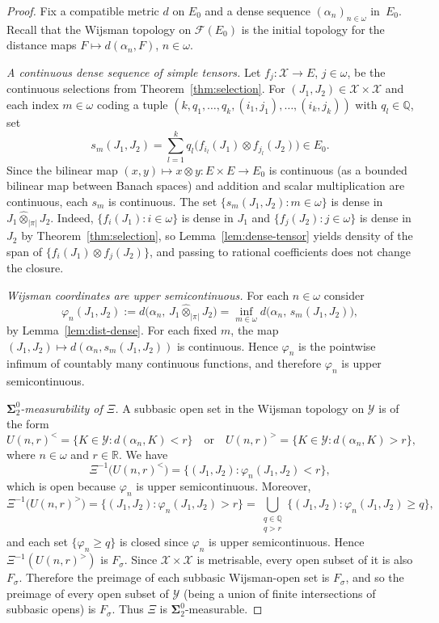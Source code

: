 \documentclass[10pt,a4paper]{amsart}
\newcommand{\R}{\mathbb{R}}
\newcommand{\bbQ}{\mathbb{Q}}
\renewcommand{\ge}{\geqslant}
\begin{document}
\begin{proof}
Fix a compatible metric $d$ on $E_0$ and a dense sequence
$(\alpha_n)_{n \in \omega}$ in~$E_0$.  Recall that the Wijsman topology on
$\mathcal{F}(E_0)$ is the initial topology for the distance maps
$F \mapsto d(\alpha_n, F)$, $n \in \omega$.

\medskip
\emph{A continuous dense sequence of simple tensors.}
Let $f_j \colon \mathscr{X} \to E$, $j \in \omega$, be the continuous selections
from Theorem~\ref{thm:selection}.  For
$(J_1, J_2) \in \mathscr{X} \times \mathscr{X}$ and each index $m \in \omega$
coding a tuple $(k, q_1, \ldots, q_k, (i_1, j_1), \ldots, (i_k, j_k))$ with
$q_l \in \bbQ$, set
\[
    s_m(J_1, J_2)
    = \sum_{l=1}^k q_l \bigl(f_{i_l}(J_1) \otimes f_{j_l}(J_2)\bigr) \in E_0.
\]
Since the bilinear map $(x, y) \mapsto x \otimes y \colon E \times E \to E_0$ is
continuous (as a bounded bilinear map between Banach spaces) and addition and
scalar multiplication are continuous, each $s_m$ is continuous.  The set
$\{s_m(J_1, J_2) \colon m \in \omega\}$ is dense in
$J_1 \hat{\otimes}_{|\pi|} J_2$.  Indeed,
$\{f_i(J_1) \colon i \in \omega\}$ is dense in $J_1$ and
$\{f_j(J_2) \colon j \in \omega\}$ is dense in $J_2$ by
Theorem~\ref{thm:selection}, so Lemma~\ref{lem:dense-tensor} yields density of
the span of $\{f_i(J_1) \otimes f_j(J_2)\}$, and passing to rational
coefficients does not change the closure.

\medskip
\emph{Wijsman coordinates are upper semicontinuous.}
For each $n \in \omega$ consider
\[
    \varphi_n(J_1, J_2)
    := d\bigl(\alpha_n,\, J_1 \hat{\otimes}_{|\pi|} J_2\bigr)
    = \inf_{m \in \omega} d\bigl(\alpha_n,\, s_m(J_1, J_2)\bigr),
\]
by Lemma~\ref{lem:dist-dense}.  For each fixed $m$, the map
$(J_1, J_2) \mapsto d(\alpha_n, s_m(J_1, J_2))$ is continuous.  Hence $\varphi_n$
is the pointwise infimum of countably many continuous functions, and therefore
$\varphi_n$ is upper semicontinuous.

\medskip
\emph{$\boldsymbol{\Sigma}^0_2$-measurability of $\Xi$.}
A subbasic open set in the Wijsman topology on $\mathscr{Y}$ is of the form
\[
    U(n,r)^{<} = \{K \in \mathscr{Y} \colon d(\alpha_n, K) < r\}
    \quad\text{or}\quad
    U(n,r)^{>} = \{K \in \mathscr{Y} \colon d(\alpha_n, K) > r\},
\]
where $n \in \omega$ and $r \in \R$.  We have
\[
    \Xi^{-1}\bigl(U(n,r)^{<}\bigr)
    = \{(J_1, J_2) \colon \varphi_n(J_1, J_2) < r\},
\]
which is open because $\varphi_n$ is upper semicontinuous.  Moreover,
\[
    \Xi^{-1}\bigl(U(n,r)^{>}\bigr)
    = \{(J_1, J_2) \colon \varphi_n(J_1, J_2) > r\}
    = \bigcup_{\substack{q \in \bbQ \\ q > r}}
      \{(J_1, J_2) \colon \varphi_n(J_1, J_2) \ge q\},
\]
and each set $\{\varphi_n \ge q\}$ is closed since $\varphi_n$ is upper
semicontinuous.  Hence $\Xi^{-1}(U(n,r)^{>})$ is $F_\sigma$.
Since $\mathscr{X} \times \mathscr{X}$ is metrisable, every open subset of it is
also $F_\sigma$. Therefore the preimage of each subbasic Wijsman-open set is
$F_\sigma$, and so the preimage of every open subset of $\mathscr{Y}$ (being a
union of finite intersections of subbasic opens) is $F_\sigma$.
Thus $\Xi$ is $\boldsymbol{\Sigma}^0_2$-measurable.


\end{proof}
\end{document}
